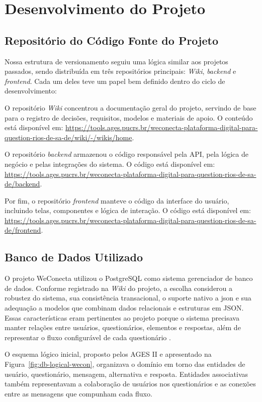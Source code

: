 \section[Desenvolvimento do Projeto]{Desenvolvimento do Projeto}

\subsection{Repositório do Código Fonte do Projeto}
Nossa estrutura de versionamento seguiu uma lógica similar aos projetos passados, sendo distribuída em três repositórios principais: \textit{Wiki}, \textit{backend} e \textit{frontend}. Cada um deles teve um papel bem definido dentro do ciclo de desenvolvimento:

O repositório \textit{Wiki} concentrou a documentação geral do projeto, servindo de base para o registro de decisões, requisitos, modelos e materiais de apoio. O conteúdo está disponível em: \url{https://tools.ages.pucrs.br/weconecta-plataforma-digital-para-question-rios-de-sa-de/wiki/-/wikis/home}.

O repositório \textit{backend} armazenou o código responsável pela API, pela lógica de negócio e pelas integrações do sistema. O código está disponível em: \url{https://tools.ages.pucrs.br/weconecta-plataforma-digital-para-question-rios-de-sa-de/backend}.

Por fim, o repositório \textit{frontend} manteve o código da interface do usuário, incluindo telas, componentes e lógica de interação. O código está disponível em: \url{https://tools.ages.pucrs.br/weconecta-plataforma-digital-para-question-rios-de-sa-de/frontend}.



\subsection{Banco de Dados Utilizado}
O projeto WeConecta utilizou o PostgreSQL como sistema gerenciador de banco de dados. Conforme registrado na \textit{Wiki} do projeto, a escolha considerou a robustez do sistema, sua consistência transacional, o suporte nativo a \ac{json} e sua adequação a modelos que combinam dados relacionais e estruturas em JSON. Essas características eram pertinentes ao projeto porque o sistema precisava manter relações entre usuários, questionários, elementos e respostas, além de representar o fluxo configurável de cada questionário \cite{postgresql}.

O esquema lógico inicial, proposto pelos AGES II e apresentado na Figura~\ref{fig:db-logical-wecon}, organizava o domínio em torno das entidades de usuário, questionário, mensagem, alternativa e resposta. Entidades associativas também representavam a colaboração de usuários nos questionários e as conexões entre as mensagens que compunham cada fluxo.

